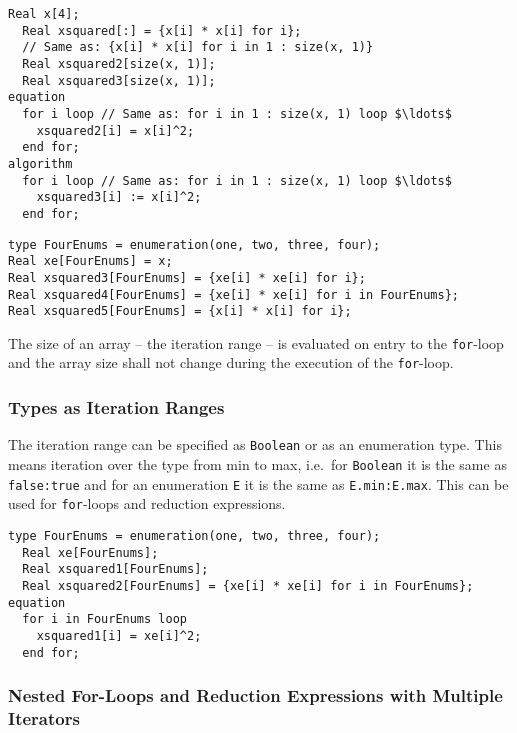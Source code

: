 \begin{example}
\begin{lstlisting}[language=modelica]
  Real x[4];
  Real xsquared[:] = {x[i] * x[i] for i};
  // Same as: {x[i] * x[i] for i in 1 : size(x, 1)}
  Real xsquared2[size(x, 1)];
  Real xsquared3[size(x, 1)];
equation
  for i loop // Same as: for i in 1 : size(x, 1) loop $\ldots$
    xsquared2[i] = x[i]^2;
  end for;
algorithm
  for i loop // Same as: for i in 1 : size(x, 1) loop $\ldots$
    xsquared3[i] := x[i]^2;
  end for;
\end{lstlisting}

\begin{lstlisting}[language=modelica]
type FourEnums = enumeration(one, two, three, four);
Real xe[FourEnums] = x;
Real xsquared3[FourEnums] = {xe[i] * xe[i] for i};
Real xsquared4[FourEnums] = {xe[i] * xe[i] for i in FourEnums};
Real xsquared5[FourEnums] = {x[i] * x[i] for i};
\end{lstlisting}
\end{example}

The size of an array -- the iteration range -- is evaluated on entry to the \lstinline!for!-loop and the array size shall not change during the execution of the \lstinline!for!-loop.

\subsubsection{Types as Iteration Ranges}\label{types-as-iteration-ranges}

The iteration range can be specified as \lstinline!Boolean! or as an enumeration type.
This means iteration over the type from min to max, i.e.\ for \lstinline!Boolean! it is the same as \lstinline!false:true! and for an enumeration \lstinline!E! it is the same as \lstinline!E.min:E.max!.
This can be used for \lstinline!for!-loops and reduction expressions.

\begin{example}
\begin{lstlisting}[language=modelica]
  type FourEnums = enumeration(one, two, three, four);
  Real xe[FourEnums];
  Real xsquared1[FourEnums];
  Real xsquared2[FourEnums] = {xe[i] * xe[i] for i in FourEnums};
equation
  for i in FourEnums loop
    xsquared1[i] = xe[i]^2;
  end for;
\end{lstlisting}
\end{example}

\subsubsection{Nested For-Loops and Reduction Expressions with Multiple Iterators}\label{nested-for-loops-and-reduction-expressions-with-multiple-iterators}

